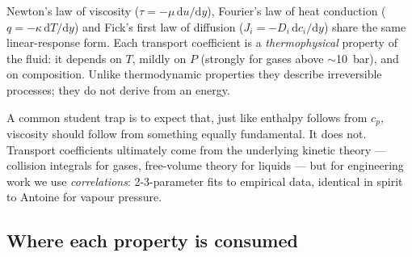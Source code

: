 \documentclass[11pt,a4paper]{article}
\begin{document}
Newton's law of viscosity ($\tau = -\mu\,\mathrm{d}u/\mathrm{d}y$),
Fourier's law of heat conduction ($q = -\kappa\,\mathrm{d}T/\mathrm{d}y$)
and Fick's first law of diffusion ($J_i = -D_i\,\mathrm{d}c_i/\mathrm{d}y$)
share the same linear-response form.  Each transport coefficient is
a \emph{thermophysical} property of the fluid: it depends on $T$,
mildly on $P$ (strongly for gases above $\sim$10~bar), and on
composition.  Unlike thermodynamic properties they describe
irreversible processes; they do not derive from an energy.

\begin{intuition}
A common student trap is to expect that, just like enthalpy follows
from $c_p$, viscosity should follow from something equally
fundamental.  It does not.  Transport coefficients ultimately come
from the underlying kinetic theory --- collision integrals for
gases, free-volume theory for liquids --- but for engineering work
we use \emph{correlations}: 2-3-parameter fits to empirical data,
identical in spirit to Antoine for vapour pressure.
\end{intuition}

\subsection{Where each property is consumed}
\end{document}
